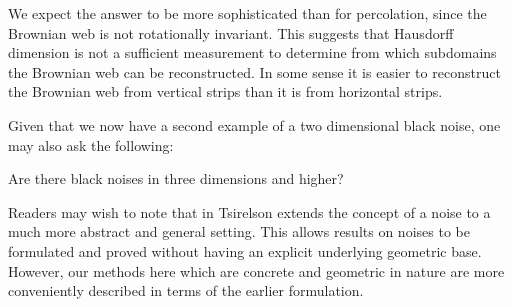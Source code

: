 {We expect the answer to be more sophisticated than for percolation,
since the Brownian web is not rotationally invariant.
This suggests that Hausdorff dimension is not a sufficient measurement
to determine from which subdomains the Brownian web can be
reconstructed.  In some sense it is easier to reconstruct the Brownian
web from vertical strips than it is from horizontal strips.

Given that we now have a second example of a two dimensional black
noise, one may also ask the following:

\begin{openproblem}
  Are there black noises in three dimensions and higher?
\end{openproblem}

Readers may wish to note that in
\cite{tsirelson-noise-as-a-boolean-algebra} Tsirelson extends the
concept of a noise to a much more abstract and general setting.  This
allows results on noises to be formulated and proved without having an
explicit underlying geometric base.  However, our methods here which are
concrete and geometric in nature are more conveniently described in terms
of the earlier formulation.
}
